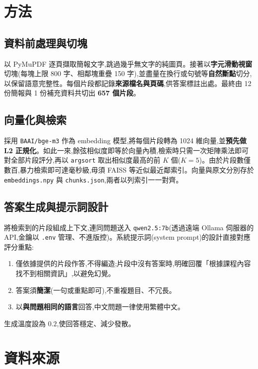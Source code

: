 \documentclass[12pt]{ctexart}
\begin{document}
\section{方法}

\subsection{資料前處理與切塊}
以 PyMuPDF 逐頁擷取簡報文字,跳過幾乎無文字的純圖頁。接著以\textbf{字元滑動視窗}切塊(每塊上限 800 字、相鄰塊重疊 150 字),並盡量在換行或句號等\textbf{自然斷點}切分,以保留語意完整性。每個片段都記錄\textbf{來源檔名與頁碼},供答案標註出處。最終由 12 份簡報與 1 份補充資料共切出 \textbf{657 個片段}。

\subsection{向量化與檢索}
採用 \texttt{BAAI/bge-m3} 作為 embedding 模型,將每個片段轉為 1024 維向量,並\textbf{預先做 L2 正規化}。如此一來,餘弦相似度即等於向量內積,檢索時只需一次矩陣乘法即可對全部片段評分,再以 \texttt{argsort} 取出相似度最高的前 $K$ 個($K=5$)。由於片段數僅數百,暴力檢索即可達毫秒級,毋須 FAISS 等近似最近鄰索引。向量與原文分別存於 \texttt{embeddings.npy} 與 \texttt{chunks.json},兩者以列索引一一對齊。

\subsection{答案生成與提示詞設計}
將檢索到的片段組成上下文,連同問題送入 \texttt{qwen2.5:7b}(透過遠端 Ollama 伺服器的 API,金鑰以 \texttt{.env} 管理、不進版控)。系統提示詞(system prompt)的設計直接對應評分重點:
\begin{enumerate}[leftmargin=2em]
  \item 僅依據提供的片段作答,不得編造;片段中沒有答案時,明確回覆「根據課程內容找不到相關資訊」,以避免幻覺。
  \item 答案須\textbf{簡潔}(一句或重點即可),不重複題目、不冗長。
  \item 以\textbf{與問題相同的語言}回答,中文問題一律使用繁體中文。
\end{enumerate}
生成溫度設為 $0.2$,使回答穩定、減少發散。

\section{資料來源}
\end{document}
